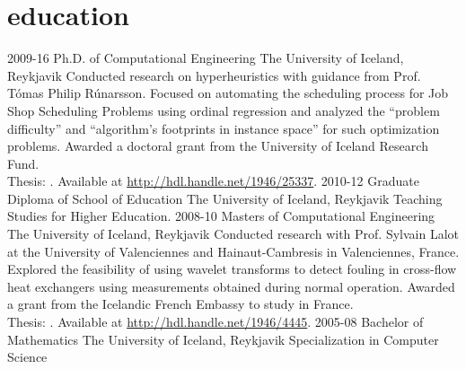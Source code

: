 \section{education}
\begin{entrylist}
\entry
{2009-16}
{Ph.D. {\normalfont of Computational Engineering}}
{The University of Iceland, Reykjavik}
{Conducted research on hyperheuristics with guidance from Prof. Tómas Philip Rúnarsson. Focused on automating the scheduling process for Job Shop Scheduling Problems using ordinal regression and analyzed the ``problem difficulty'' and ``algorithm's footprints in instance space'' for such optimization problems. Awarded a doctoral grant from the University of Iceland Research Fund. \\
{\boldfont Thesis:} . 
Available at \url{http://hdl.handle.net/1946/25337}.}
\entry
{2010-12}
{Graduate Diploma {\normalfont of School of Education}}
{The University of Iceland, Reykjavik}
{Teaching Studies for Higher Education.}
\entry
{2008-10}
{Masters {\normalfont of Computational Engineering}}
{The University of Iceland, Reykjavik}
{Conducted research with Prof. Sylvain Lalot at the University of Valenciennes and Hainaut-Cambresis in Valenciennes, France. Explored the feasibility of using wavelet transforms to detect fouling in cross-flow heat exchangers using measurements obtained during normal operation.
Awarded a grant from the Icelandic French Embassy to study in France. \\	
{\boldfont Thesis:} . 
Available at \url{http://hdl.handle.net/1946/4445}.}
\entry
{2005-08}
{Bachelor {\normalfont of Mathematics}}
{The University of Iceland, Reykjavik}
{Specialization in Computer Science}
\end{entrylist}

